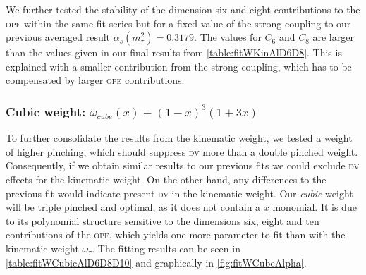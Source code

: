 \documentclass[../../index.tex]{subfiles}
\begin{document}
We further tested the stability of the dimension six and eight contributions to
the \textsc{ope} within the same fit series but for a fixed value of the strong
coupling to our previous averaged result \(\alpha_s(m_\tau^2)=0.3179\). The
values for \(C_6\) and \(C_8\) are larger than the values given in our final
results from \cref{table:fitWKinAlD6D8}. This is explained with a smaller
contribution from the strong coupling, which has to be compensated by larger
\textsc{ope} contributions.

\subsubsection{Cubic weight: \(\omega_{cube}(x) \equiv (1-x)^3(1+3x)\)}
\label{sec:cubicWeight}
To further consolidate the results from the kinematic weight, we tested a weight
of higher pinching, which should suppress \textsc{dv} more than a double pinched
weight. Consequently, if we obtain similar results to our previous fits we could
exclude \textsc{dv} effects for the kinematic weight. On the other hand, any
differences to the previous fit would indicate present \textsc{dv} in the
kinematic weight. Our \textit{cubic} weight will be triple pinched and optimal,
as it does not contain a \(x\) monomial. It is due to its polynomial structure
sensitive to the dimensions six, eight and ten contributions of the
\textsc{ope}, which yields one more parameter to fit than with the kinematic
weight \(\omega_\tau\). The fitting results can be seen in
\cref{table:fitWCubicAlD6D8D10} and graphically in \cref{fig:fitWCubeAlpha}.
\end{document}
